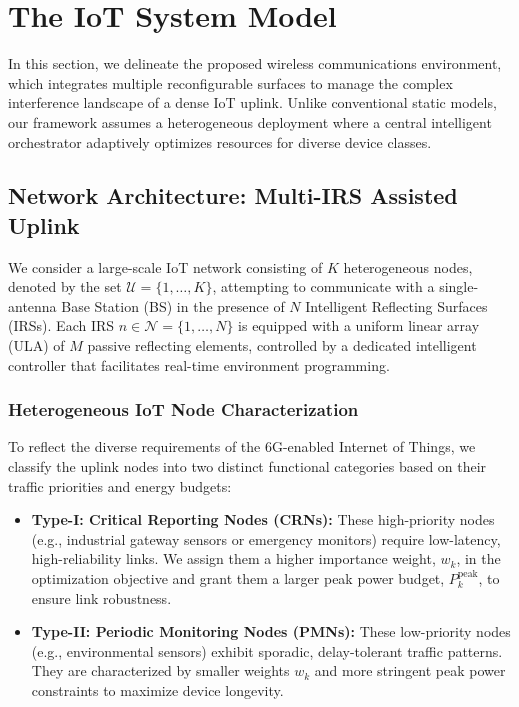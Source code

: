 \documentclass[journal]{IEEEtran}
\begin{document}
\section{The IoT System Model}
\label{sec:system_model}

In this section, we delineate the proposed wireless communications environment, which integrates multiple reconfigurable surfaces to manage the complex interference landscape of a dense IoT uplink. Unlike conventional static models, our framework assumes a heterogeneous deployment where a central intelligent orchestrator adaptively optimizes resources for diverse device classes.

\subsection{Network Architecture: Multi-IRS Assisted Uplink}
\label{subsec:architecture}

We consider a large-scale IoT network consisting of $K$ heterogeneous nodes, denoted by the set $\mathcal{U} = \{1, \dots, K\}$, attempting to communicate with a single-antenna Base Station (BS) in the presence of $N$ Intelligent Reflecting Surfaces (IRSs). Each IRS $n \in \mathcal{N} = \{1, \dots, N\}$ is equipped with a uniform linear array (ULA) of $M$ passive reflecting elements, controlled by a dedicated intelligent controller that facilitates real-time environment programming.

\subsubsection{Heterogeneous IoT Node Characterization}
\label{subsubsec:nodes}

To reflect the diverse requirements of the 6G-enabled Internet of Things, we classify the uplink nodes into two distinct functional categories based on their traffic priorities and energy budgets:

\begin{itemize}
    \item \textbf{Type-I: Critical Reporting Nodes (CRNs):} These high-priority nodes (e.g., industrial gateway sensors or emergency monitors) require low-latency, high-reliability links. We assign them a higher importance weight, $w_k$, in the optimization objective and grant them a larger peak power budget, $P_k^{\text{peak}}$, to ensure link robustness.
    
    \item \textbf{Type-II: Periodic Monitoring Nodes (PMNs):} These low-priority nodes (e.g., environmental sensors) exhibit sporadic, delay-tolerant traffic patterns. They are characterized by smaller weights $w_k$ and more stringent peak power constraints to maximize device longevity.
\end{itemize}
\end{document}
